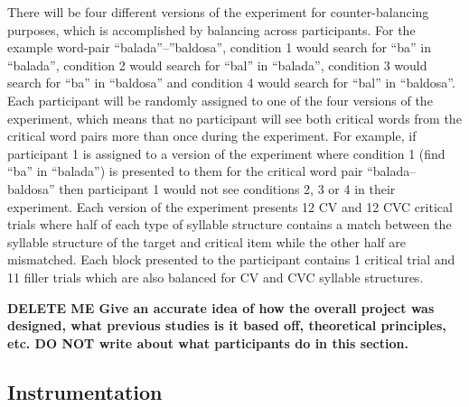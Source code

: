 There will be four different versions of the experiment for counter-balancing purposes, which is accomplished by balancing across participants. For the example word-pair “balada”–”baldosa”, condition 1 would search for “ba” in “balada”, condition 2 would search for “bal” in “balada”, condition 3 would search for “ba” in “baldosa” and condition 4 would search for “bal” in “baldosa”. Each participant will be randomly assigned to one of the four versions of the experiment, which means that no participant will see both critical words from the critical word pairs more than once during the experiment. For example, if participant 1 is assigned to a version of the experiment where condition 1 (find “ba” in “balada”) is presented to them for the critical word pair “balada–baldosa” then participant 1 would not see conditions 2, 3 or 4 in their experiment. Each version of the experiment presents 12 CV and 12 CVC critical trials where half of each type of syllable structure contains a match between the syllable structure of the target and critical item while the other half are mismatched. Each block presented to the participant contains 1 critical trial and 11 filler trials which are also balanced for CV and CVC syllable structures.

\textbf{DELETE ME Give an accurate idea of how the overall project was designed, what previous studies is it based off, theoretical principles, etc.
DO NOT write about what participants do in this section.}

\subsection{Instrumentation}

